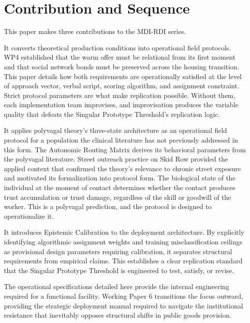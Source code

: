 \documentclass[12pt, letterpaper]{article}
\begin{document}
\clearpage

\clearpage
\section{Contribution and Sequence}

This paper makes three contributions to the MDI-RDI series.

It converts theoretical production conditions into operational field protocols. WP4 established that the warm offer must be relational from its first moment and that social network bonds must be preserved across the housing transition. This paper details how both requirements are operationally satisfied at the level of approach vector, verbal script, scoring algorithm, and assignment constraint. Strict protocol parameters are what make replication possible. Without them, each implementation team improvises, and improvisation produces the variable quality that defeats the Singular Prototype Threshold's replication logic.

It applies polyvagal theory's three-state architecture as an operational field protocol for a population the clinical literature has not previously addressed in this form. The Autonomic Routing Matrix derives its behavioral parameters from the polyvagal literature. Street outreach practice on Skid Row provided the applied context that confirmed the theory's relevance to chronic street exposure and motivated its formalization into protocol form. The biological state of the individual at the moment of contact determines whether the contact produces trust accumulation or trust damage, regardless of the skill or goodwill of the worker. This is a polyvagal prediction, and the protocol is designed to operationalize it.

It introduces Epistemic Calibration to the deployment architecture. By explicitly identifying algorithmic assignment weights and training misclassification ceilings as provisional design parameters requiring calibration, it separates structural requirements from empirical claims. This establishes a clear replication standard that the Singular Prototype Threshold is engineered to test, satisfy, or revise.

The operational specifications detailed here provide the internal engineering required for a functional facility. Working Paper 6 transitions the focus outward, providing the strategic deployment manual required to navigate the institutional resistance that inevitably opposes structural shifts in public goods provision.
\end{document}
